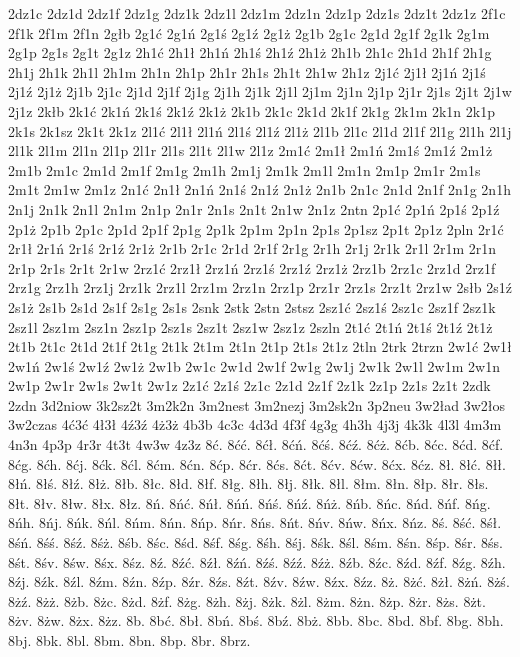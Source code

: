 {2dz1c
2dz1d
2dz1f
2dz1g
2dz1k
2dz1l
2dz1m
2dz1n
2dz1p
2dz1s
2dz1t
2dz1z
2f1c
2f1k
2f1m
2f1n
2głb
2g1ć
2g1ń
2g1ś
2g1ź
2g1ż
2g1b
2g1c
2g1d
2g1f
2g1k
2g1m
2g1p
2g1s
2g1t
2g1z
2h1ć
2h1ł
2h1ń
2h1ś
2h1ź
2h1ż
2h1b
2h1c
2h1d
2h1f
2h1g
2h1j
2h1k
2h1l
2h1m
2h1n
2h1p
2h1r
2h1s
2h1t
2h1w
2h1z
2j1ć
2j1ł
2j1ń
2j1ś
2j1ź
2j1ż
2j1b
2j1c
2j1d
2j1f
2j1g
2j1h
2j1k
2j1l
2j1m
2j1n
2j1p
2j1r
2j1s
2j1t
2j1w
2j1z
2kłb
2k1ć
2k1ń
2k1ś
2k1ź
2k1ż
2k1b
2k1c
2k1d
2k1f
2k1g
2k1m
2k1n
2k1p
2k1s
2k1sz
2k1t
2k1z
2l1ć
2l1ł
2l1ń
2l1ś
2l1ź
2l1ż
2l1b
2l1c
2l1d
2l1f
2l1g
2l1h
2l1j
2l1k
2l1m
2l1n
2l1p
2l1r
2l1s
2l1t
2l1w
2l1z
2m1ć
2m1ł
2m1ń
2m1ś
2m1ź
2m1ż
2m1b
2m1c
2m1d
2m1f
2m1g
2m1h
2m1j
2m1k
2m1l
2m1n
2m1p
2m1r
2m1s
2m1t
2m1w
2m1z
2n1ć
2n1ł
2n1ń
2n1ś
2n1ź
2n1ż
2n1b
2n1c
2n1d
2n1f
2n1g
2n1h
2n1j
2n1k
2n1l
2n1m
2n1p
2n1r
2n1s
2n1t
2n1w
2n1z
2ntn
2p1ć
2p1ń
2p1ś
2p1ź
2p1ż
2p1b
2p1c
2p1d
2p1f
2p1g
2p1k
2p1m
2p1n
2p1s
2p1sz
2p1t
2p1z
2pln
2r1ć
2r1ł
2r1ń
2r1ś
2r1ź
2r1ż
2r1b
2r1c
2r1d
2r1f
2r1g
2r1h
2r1j
2r1k
2r1l
2r1m
2r1n
2r1p
2r1s
2r1t
2r1w
2rz1ć
2rz1ł
2rz1ń
2rz1ś
2rz1ź
2rz1ż
2rz1b
2rz1c
2rz1d
2rz1f
2rz1g
2rz1h
2rz1j
2rz1k
2rz1l
2rz1m
2rz1n
2rz1p
2rz1r
2rz1s
2rz1t
2rz1w
2słb
2s1ź
2s1ż
2s1b
2s1d
2s1f
2s1g
2s1s
2snk
2stk
2stn
2stsz
2sz1ć
2sz1ś
2sz1c
2sz1f
2sz1k
2sz1l
2sz1m
2sz1n
2sz1p
2sz1s
2sz1t
2sz1w
2sz1z
2szln
2t1ć
2t1ń
2t1ś
2t1ź
2t1ż
2t1b
2t1c
2t1d
2t1f
2t1g
2t1k
2t1m
2t1n
2t1p
2t1s
2t1z
2tln
2trk
2trzn
2w1ć
2w1ł
2w1ń
2w1ś
2w1ź
2w1ż
2w1b
2w1c
2w1d
2w1f
2w1g
2w1j
2w1k
2w1l
2w1m
2w1n
2w1p
2w1r
2w1s
2w1t
2w1z
2z1ć
2z1ś
2z1c
2z1d
2z1f
2z1k
2z1p
2z1s
2z1t
2zdk
2zdn
3d2niow
3k2sz2t
3m2k2n
3m2nest
3m2nezj
3m2sk2n
3p2neu
3w2ład
3w2łos
3w2czas
4ć3ć
4ł3ł
4ź3ź
4ż3ż
4b3b
4c3c
4d3d
4f3f
4g3g
4h3h
4j3j
4k3k
4l3l
4m3m
4n3n
4p3p
4r3r
4t3t
4w3w
4z3z
8ć.
8ćć.
8ćł.
8ćń.
8ćś.
8ćź.
8ćż.
8ćb.
8ćc.
8ćd.
8ćf.
8ćg.
8ćh.
8ćj.
8ćk.
8ćl.
8ćm.
8ćn.
8ćp.
8ćr.
8ćs.
8ćt.
8ćv.
8ćw.
8ćx.
8ćz.
8ł.
8łć.
8łł.
8łń.
8łś.
8łź.
8łż.
8łb.
8łc.
8łd.
8łf.
8łg.
8łh.
8łj.
8łk.
8łl.
8łm.
8łn.
8łp.
8łr.
8łs.
8łt.
8łv.
8łw.
8łx.
8łz.
8ń.
8ńć.
8ńł.
8ńń.
8ńś.
8ńź.
8ńż.
8ńb.
8ńc.
8ńd.
8ńf.
8ńg.
8ńh.
8ńj.
8ńk.
8ńl.
8ńm.
8ńn.
8ńp.
8ńr.
8ńs.
8ńt.
8ńv.
8ńw.
8ńx.
8ńz.
8ś.
8ść.
8śł.
8śń.
8śś.
8śź.
8śż.
8śb.
8śc.
8śd.
8śf.
8śg.
8śh.
8śj.
8śk.
8śl.
8śm.
8śn.
8śp.
8śr.
8śs.
8śt.
8śv.
8św.
8śx.
8śz.
8ź.
8źć.
8źł.
8źń.
8źś.
8źź.
8źż.
8źb.
8źc.
8źd.
8źf.
8źg.
8źh.
8źj.
8źk.
8źl.
8źm.
8źn.
8źp.
8źr.
8źs.
8źt.
8źv.
8źw.
8źx.
8źz.
8ż.
8żć.
8żł.
8żń.
8żś.
8żź.
8żż.
8żb.
8żc.
8żd.
8żf.
8żg.
8żh.
8żj.
8żk.
8żl.
8żm.
8żn.
8żp.
8żr.
8żs.
8żt.
8żv.
8żw.
8żx.
8żz.
8b.
8bć.
8bł.
8bń.
8bś.
8bź.
8bż.
8bb.
8bc.
8bd.
8bf.
8bg.
8bh.
8bj.
8bk.
8bl.
8bm.
8bn.
8bp.
8br.
8brz.
}
